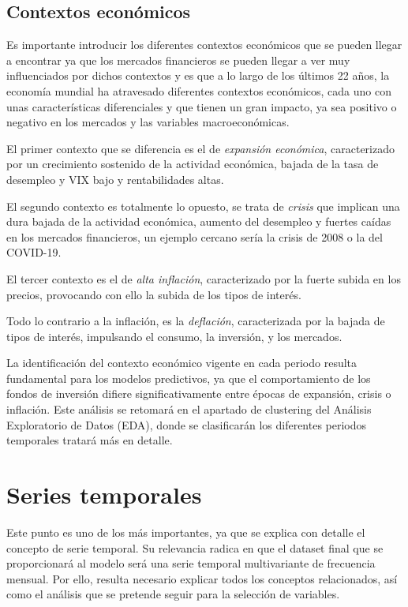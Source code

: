 \subsection{Contextos económicos}
Es importante introducir los diferentes contextos económicos que se pueden llegar a encontrar ya que los mercados financieros se pueden llegar a ver muy influenciados por dichos contextos y es que a lo largo de los últimos 22 años, la economía mundial ha atravesado diferentes contextos económicos, cada uno con unas características diferenciales y que tienen un gran impacto, ya sea positivo o negativo en los mercados y las variables macroeconómicas. 

El primer contexto que se diferencia es el de \emph{expansión económica}, caracterizado por un crecimiento sostenido de la actividad económica, bajada de la tasa de desempleo y VIX bajo y rentabilidades altas. 

El segundo contexto es totalmente lo opuesto, se trata de \emph{crisis} que implican una dura bajada de la actividad económica, aumento del desempleo y fuertes caídas en los mercados financieros, un ejemplo cercano sería la crisis de 2008 o la del COVID-19.  

El tercer contexto es el de \emph{alta inflación}, caracterizado por la fuerte subida en los precios, provocando con ello la subida de los tipos de interés. 

Todo lo contrario a la inflación, es la \emph{deflación}, caracterizada por la bajada de tipos de interés, impulsando el consumo, la inversión, y los mercados. 

La identificación del contexto económico vigente en cada periodo resulta fundamental para los modelos predictivos, ya que el comportamiento de los fondos de inversión difiere significativamente entre épocas de expansión, crisis o inflación. Este análisis se retomará en el apartado de clustering del Análisis Exploratorio de Datos (EDA), donde se clasificarán los diferentes periodos temporales tratará más en detalle.

\section{Series temporales}
Este punto es uno de los más importantes, ya que se explica con detalle el concepto de serie temporal. Su relevancia radica en que el dataset final que se proporcionará al modelo será una serie temporal multivariante de frecuencia mensual. Por ello, resulta necesario explicar todos los conceptos relacionados, así como el análisis que se pretende seguir para la selección de variables.

